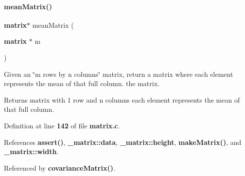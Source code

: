 \paragraph{mean\+Matrix()}
{\footnotesize\ttfamily \textbf{ matrix}$\ast$ mean\+Matrix (\begin{DoxyParamCaption}\item[{\textbf{ matrix} $\ast$}]{m }\end{DoxyParamCaption})}



Given an \char`\"{}m rows by n columns\char`\"{} matrix, return a matrix where each element represents the mean of that full column.  the matrix. 

\begin{DoxyReturn}{Returns}
matrix with 1 row and n columns each element represents the mean of that full column. 
\end{DoxyReturn}


Definition at line \textbf{ 142} of file \textbf{ matrix.\+c}.



References \textbf{ assert()}, \textbf{ \+\_\+matrix\+::data}, \textbf{ \+\_\+matrix\+::height}, \textbf{ make\+Matrix()}, and \textbf{ \+\_\+matrix\+::width}.



Referenced by \textbf{ covariance\+Matrix()}.


